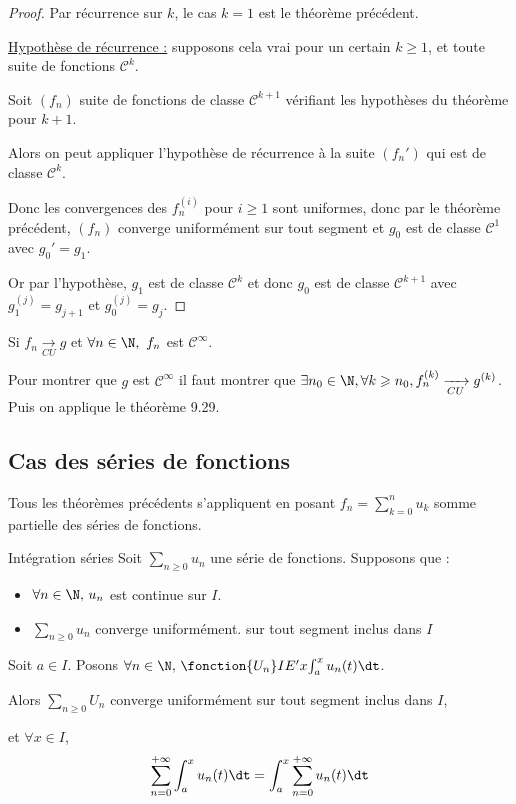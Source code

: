 
\begin{proof}
    Par récurrence sur $k$, le cas $k = 1$ est le théorème précédent.

    \uline{Hypothèse de récurrence :} supposons cela vrai pour un certain $k \geqslant 1$, et toute 
    suite de fonctions $\mathscr C^k$. 

    Soit $(f_n)$ suite de fonctions de classe $\mathscr{C}^{k + 1}$ vérifiant les hypothèses du théorème pour $k + 1$.

    Alors on peut appliquer l'hypothèse de récurrence à la suite $(f_n')$ qui est de classe $\mathscr{C}^k$.

    Donc les convergences des $f_n^{(i)}$ pour $i \geqslant 1$ sont uniformes, donc 
    par le théorème précédent, $(f_n)$ converge uniformément sur tout segment et 
    $g_0$ est de classe $\mathscr{C}^1$ avec $g_0' = g_1$. 

    Or par l'hypothèse, $g_1$ est de classe $\mathscr{C}^k$ et donc $g_0$ est de classe $\mathscr{C}^{k + 1}$ avec
    $g_1^{(j)} = g_{j + 1}$ et $g_0^{(j)} = g_j$.
\end{proof}

\begin{remarque}
    Si $f_n \xrightarrow[CU]{} g$ et $\forall n \in \N, ~ f_n$ est $\mathscr C^{\infty}$.

    Pour montrer que $g$ est $\mathscr C^{\infty}$ il faut montrer que $\exists n_0 \in \N, \forall k \geqslant n_0,  f_n^{(k)} \xrightarrow[CU]{} g^{(k)}$.
    Puis on applique le théorème 9.29.    
\end{remarque}

\subsection{Cas des séries de fonctions}

Tous les théorèmes précédents s'appliquent en posant $\displaystyle f_n = \sum_{k = 0}^n u_k$ somme partielle des 
séries de fonctions.

\begin{theoreme}{Intégration séries}{}
    Soit $\sum_{n \geqslant 0} u_n$ une série de fonctions. Supposons que : 
    \begin{itemize}
        \item $\forall n \in \N, \, u_n$ est continue sur $I$.
        \item $\sum_{n \geqslant 0} u_n$ converge uniformément. 
    sur tout segment inclus dans $I$
    \end{itemize}
    Soit $a \in I$. Posons $\forall n \in \N, \, \fonction{U_n} I {E'}{x}{\int_a^x u_n(t) \dt}$.

    Alors $\sum_{n \geqslant 0} U_n$ converge uniformément sur tout segment inclus dans $I$, 
    
    et 
    $\forall x \in I$, 
    \[\sum_{n = 0 }^{+ \infty } \int_{a }^{x } u_n(t) \dt = \int_{a}^{x } \sum_{n = 0}^{+ \infty} u_n(t) \dt\]
\end{theoreme}

